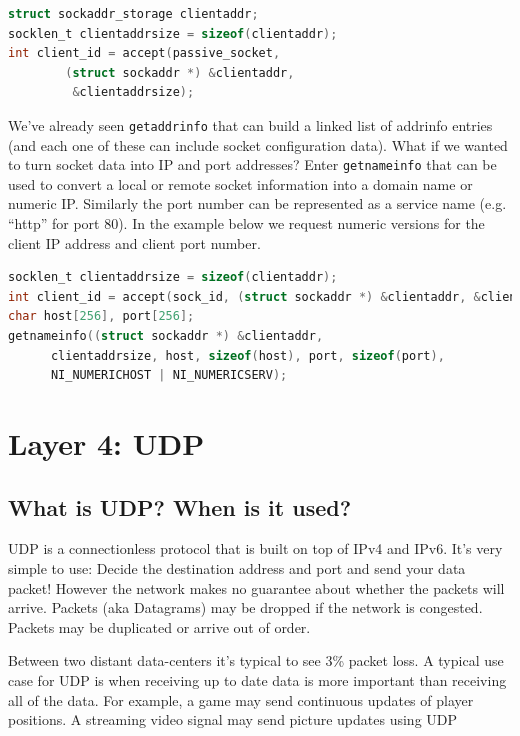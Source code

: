 \begin{lstlisting}[language=C]
struct sockaddr_storage clientaddr;
socklen_t clientaddrsize = sizeof(clientaddr);
int client_id = accept(passive_socket,
        (struct sockaddr *) &clientaddr,
         &clientaddrsize);
\end{lstlisting}

We've already seen \texttt{getaddrinfo} that can build a linked list of addrinfo entries (and each one of these can include socket configuration data). What if we wanted to turn socket data into IP and port addresses? Enter \texttt{getnameinfo} that can be used to convert a local or remote socket information into a domain name or numeric IP. Similarly the port number can be represented as a service name (e.g. ``http'' for port 80). In the example below we request numeric versions for the client IP address and client port number.

\begin{lstlisting}[language=C]
socklen_t clientaddrsize = sizeof(clientaddr);
int client_id = accept(sock_id, (struct sockaddr *) &clientaddr, &clientaddrsize);
char host[256], port[256];
getnameinfo((struct sockaddr *) &clientaddr,
      clientaddrsize, host, sizeof(host), port, sizeof(port),
      NI_NUMERICHOST | NI_NUMERICSERV);
\end{lstlisting}


\section{Layer 4: UDP}

\subsection{What is UDP? When is it used?}

UDP is a connectionless protocol that is built on top of IPv4 and IPv6. It's very simple to use: Decide the destination address and port and send your data packet! However the network makes no guarantee about whether the packets will arrive. Packets (aka Datagrams) may be dropped if the network is congested. Packets may be duplicated or arrive out of order.

Between two distant data-centers it's typical to see 3\% packet loss. A typical use case for UDP is when receiving up to date data is more important than receiving all of the data. For example, a game may send continuous updates of player positions. A streaming video signal may send picture updates using UDP

